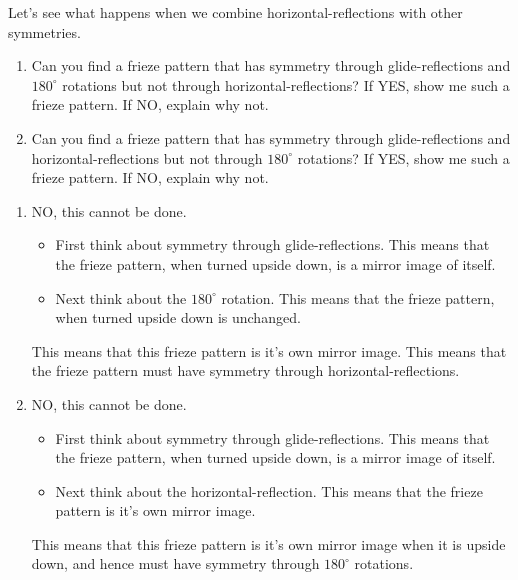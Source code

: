 \documentclass[noauthor,nooutcomes,hints,handout]{ximera}
\begin{document}
\begin{question}
  Let's see what happens when we combine horizontal-reflections with
  other symmetries.
  \begin{enumerate}
  \item Can you find a frieze pattern that has symmetry through
    glide-reflections and $180^\circ$ rotations but not through
    horizontal-reflections? If YES, show me such a frieze pattern. If
    NO, explain why not.
  \item Can you find a frieze pattern that has symmetry through
    glide-reflections and horizontal-reflections but not through
    $180^\circ$ rotations? If YES, show me such a frieze pattern. If
    NO, explain why not.
  \end{enumerate}
    
  \begin{freeResponse}
    \begin{enumerate}
    \item NO, this cannot be done.
      \begin{itemize}
      \item First think about symmetry through glide-reflections. This
        means that the frieze pattern, when turned upside down, is a
        mirror image of itself.
      \item Next think about the $180^\circ$ rotation. This means that
        the frieze pattern, when turned upside down is unchanged.
      \end{itemize}
      This means that this frieze pattern is it's own mirror image. This
      means that the frieze pattern must have symmetry through
      horizontal-reflections.
    \item NO, this cannot be done.
      \begin{itemize}
      \item First think about symmetry through glide-reflections. This
        means that the frieze pattern, when turned upside down, is a
        mirror image of itself.
      \item Next think about the horizontal-reflection. This means
        that the frieze pattern is it's own mirror image.
      \end{itemize}
      This means that this frieze pattern is it's own mirror image
      when it is upside down, and hence must have symmetry through
      $180^\circ$ rotations.
    \end{enumerate}
  \end{freeResponse}
\end{question}
\mynewpage
\end{document}
